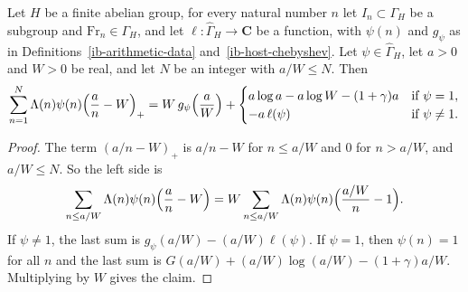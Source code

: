 \begin{lemma}\label{ib-truncation}
Let $H$ be a finite abelian group, for every natural number $n$ let
$I_n\subset\Gamma_H$ be a subgroup and $\mathrm{Fr}_n\in\Gamma_H$, and let
$\ell:\widehat\Gamma_H\to\mathbf C$ be a function, with $\psi(n)$ and $g_\psi$ as
in Definitions~\ref{ib-arithmetic-data} and~\ref{ib-host-chebyshev}. Let
$\psi\in\widehat\Gamma_H$, let $a>0$ and $W>0$ be real, and let $N$ be an integer
with $a/W\leq N$. Then
\[
 \sum_{n=1}^N\Lambda(n)\psi(n)\Bigl(\frac an-W\Bigr)_+
 =W\,g_\psi\Bigl(\frac aW\Bigr)+
 \begin{cases}a\log a-a\log W-(1+\gamma)a&\text{if }\psi=1,\\
 -a\,\ell(\psi)&\text{if }\psi\neq1.\end{cases}
\]
\end{lemma}
\begin{proof}
The term $(a/n-W)_+$ is $a/n-W$ for $n\leq a/W$ and $0$ for $n>a/W$, and
$a/W\leq N$. So the left side is
\[
 \sum_{n\leq a/W}\Lambda(n)\psi(n)\Bigl(\frac an-W\Bigr)
 =W\sum_{n\leq a/W}\Lambda(n)\psi(n)\Bigl(\frac{a/W}n-1\Bigr).
\]
If $\psi\neq1$, the last sum is $g_\psi(a/W)-(a/W)\ell(\psi)$. If $\psi=1$, then
$\psi(n)=1$ for all $n$ and the last sum is
$G(a/W)+(a/W)\log(a/W)-(1+\gamma)a/W$. Multiplying by $W$ gives the claim.
\end{proof}

